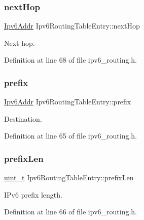 \subsubsection{\texorpdfstring{next\+Hop}{nextHop}}
{\footnotesize\ttfamily \hyperlink{ipv6_8h_aed0cbc40c61ed5b4fb681ebc55237e89}{Ipv6\+Addr} Ipv6\+Routing\+Table\+Entry\+::next\+Hop}



Next hop. 



Definition at line 68 of file ipv6\+\_\+routing.\+h.

\mbox{\label{structIpv6RoutingTableEntry_ad65e1df278c1729e94aa4fbf24a243e0}} 
\subsubsection{\texorpdfstring{prefix}{prefix}}
{\footnotesize\ttfamily \hyperlink{ipv6_8h_aed0cbc40c61ed5b4fb681ebc55237e89}{Ipv6\+Addr} Ipv6\+Routing\+Table\+Entry\+::prefix}



Destination. 



Definition at line 65 of file ipv6\+\_\+routing.\+h.

\mbox{\label{structIpv6RoutingTableEntry_afa6df2620a8ea56487ec240f9ea38a81}} 
\subsubsection{\texorpdfstring{prefix\+Len}{prefixLen}}
{\footnotesize\ttfamily \hyperlink{compiler__port_8h_a12a1e9b3ce141648783a82445d02b58d}{uint\+\_\+t} Ipv6\+Routing\+Table\+Entry\+::prefix\+Len}



I\+Pv6 prefix length. 



Definition at line 66 of file ipv6\+\_\+routing.\+h.

\mbox{\label{structIpv6RoutingTableEntry_ae9580bbd1518a8088d3fd3782874a400}} 
